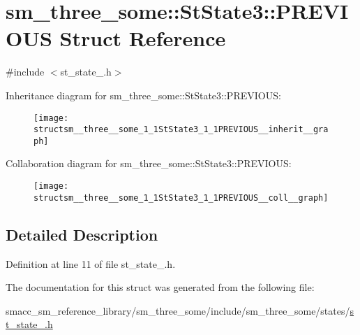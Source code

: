 \hypertarget{structsm__three__some_1_1StState3_1_1PREVIOUS}{}\section{sm\+\_\+three\+\_\+some\+:\+:St\+State3\+:\+:P\+R\+E\+V\+I\+O\+US Struct Reference}
\label{structsm__three__some_1_1StState3_1_1PREVIOUS}


{\ttfamily \#include $<$st\+\_\+state\+\_.\+h$>$}



Inheritance diagram for sm\+\_\+three\+\_\+some\+:\+:St\+State3\+:\+:P\+R\+E\+V\+I\+O\+US\+:
\nopagebreak
\begin{figure}[H]
\begin{center}
\leavevmode
\texttt{[image: structsm\_\_three\_\_some\_1\_1StState3\_1\_1PREVIOUS\_\_inherit\_\_graph]}
\end{center}
\end{figure}


Collaboration diagram for sm\+\_\+three\+\_\+some\+:\+:St\+State3\+:\+:P\+R\+E\+V\+I\+O\+US\+:
\nopagebreak
\begin{figure}[H]
\begin{center}
\leavevmode
\texttt{[image: structsm\_\_three\_\_some\_1\_1StState3\_1\_1PREVIOUS\_\_coll\_\_graph]}
\end{center}
\end{figure}


\subsection{Detailed Description}


Definition at line 11 of file st\+\_\+state\+\_.\+h.



The documentation for this struct was generated from the following file\+:\begin{DoxyCompactItemize}
\item 
smacc\+\_\+sm\+\_\+reference\+\_\+library/sm\+\_\+three\+\_\+some/include/sm\+\_\+three\+\_\+some/states/\hyperlink{sm__three__some_2include_2sm__three__some_2states_2st__state__3_8h}{st\+\_\+state\+\_.\+h}\end{DoxyCompactItemize}
